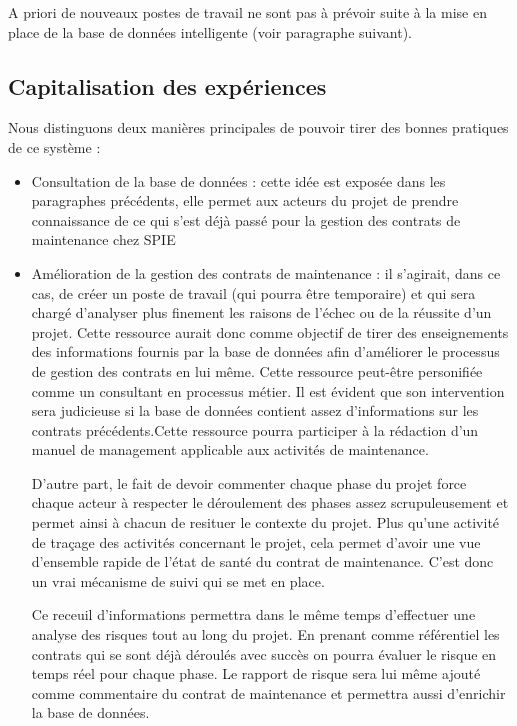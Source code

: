 A priori de nouveaux postes de travail ne sont pas à prévoir suite à la mise en place de la \og base de données intelligente \fg (voir paragraphe suivant).

\subsection{Capitalisation des expériences}
Nous distinguons deux manières principales de pouvoir tirer des bonnes pratiques de ce système :
\begin{itemize}
\item Consultation de la base de données : cette idée est exposée dans les paragraphes précédents, elle permet aux acteurs du projet de prendre connaissance de ce qui s'est déjà passé pour la gestion des contrats de maintenance chez SPIE
\item Amélioration de la gestion des contrats de maintenance : il s'agirait, dans ce cas, de créer un poste de travail (qui pourra être temporaire) et qui sera chargé d'analyser plus finement les raisons de l'échec ou de la réussite d'un projet. Cette ressource aurait donc comme objectif de tirer des enseignements des informations fournis par la base de données afin d'améliorer le processus de gestion des contrats en lui même. Cette ressource peut-être personifiée comme un consultant en processus métier. Il est évident que son intervention sera judicieuse si la base de données contient assez d'informations sur les contrats précédents.Cette ressource pourra participer à la rédaction d'un manuel de management applicable aux activités de maintenance.

\medskip

D'autre part, le fait de devoir commenter chaque phase du projet force chaque acteur à respecter le déroulement des phases assez scrupuleusement et permet ainsi à chacun de resituer le contexte du projet. Plus qu'une activité de traçage des activités concernant le projet, cela permet d'avoir une vue d'ensemble rapide de l'état de santé du contrat de maintenance. C'est donc un vrai mécanisme de suivi qui se met en place.


Ce receuil d'informations permettra dans le même temps d'effectuer une analyse des risques tout au long du projet. En prenant comme référentiel les contrats qui se sont déjà déroulés avec succès on pourra évaluer le risque en temps réel pour chaque phase. Le rapport de risque sera lui même ajouté comme \og commentaire \fg du contrat de maintenance et permettra aussi d'enrichir la base de données.

\end{itemize}
